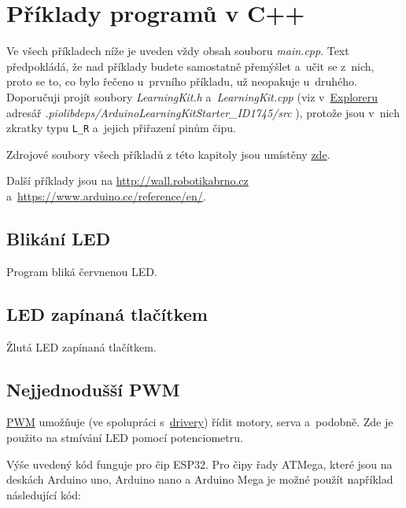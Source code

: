 

\section{Příklady programů v C++}   \label{cpppr} %

Ve všech příkladech níže je uveden vždy obsah souboru {\it main.cpp}. 
Text předpokládá, že nad příklady budete samostatně přemýšlet a~učit se z~nich, proto se to, co bylo řečeno u~prvního příkladu, už neopakuje u~druhého.  
Doporučuji projít soubory {\it LearningKit.h}
a~{\it LearningKit.cpp} (viz v~\hyperlink{explorer}{Exploreru}
adresář {\it .piolibdeps/ArduinoLearningKitStarter\_ID1745/src} ), protože jsou v~nich zkratky typu {\tt L\_R} a~jejich přiřazení pinům čipu.

Zdrojové soubory všech příkladů z této kapitoly jsou umístěny
\href{https://github.com/RoboticsBrno/RoboticsBrno-guides/tree/RoboticsManual/RoboticsManual/priklady_c}{zde}.


Další příklady jsou na \url{http://wall.robotikabrno.cz} a~\url{https://www.arduino.cc/reference/en/}.  

\label{cpppr1} \subsection{Blikání LED} 

Program bliká červnenou LED.   




\label{cpppr2} \subsection{LED zapínaná tlačítkem} 

Žlutá LED zapínaná tlačítkem.  




\label{cpppr3} \subsection{Nejjednodušší PWM} 

\hyperref[PWM]{PWM}   umožňuje (ve spolupráci
s~\hyperref[driver]{drivery}) řídit motory, serva a~podobně. Zde je použito na stmívání LED pomocí potenciometru.




Výše uvedený kód funguje pro čip ESP32. Pro čipy řady ATMega, které jsou na deskách Arduino uno, Arduino nano a Arduino Mega je možné použít například následující kód: 

